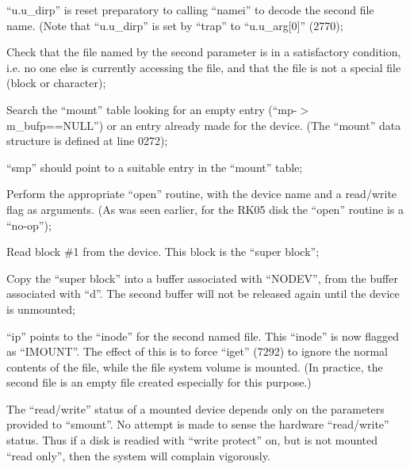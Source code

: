 \item[6096:] ``u.u\_dirp'' is  reset  preparatory
to  calling ``namei'' to decode the
second  file  name.   (Note   that
``u.u\_dirp''  is  set  by ``trap'' to
``u.u\_arg[0]'' (2770);

\item[6100:] Check that the file named by  the
      second  parameter  is in a satisfactory condition,  i.e.  no  one
      else  is  currently accessing the
      file, and that the file is not  a
      special  file  (block  or character);

\item[6103:] Search the ``mount'' table  looking
  for      an      empty      entry
  (``mp-$>$m\_bufp==NULL'') or an  entry
  already   made  for  the  device.
  (The ``mount''  data  structure  is
  defined at line 0272);


\item[6111:] ``smp'' should point to a  suitable
entry in the ``mount'' table;

\item[6113:] Perform  the  appropriate  ``open''
routine, with the device name and
a read/write flag  as  arguments.
(As  was  seen  earlier,  for the
RK05 disk the ``open'' routine is a
``no-op'');


\item[6116:] Read block \#1 from the device.
This block is the ``super block'';

\item[6124:] Copy the ``super block'' into a
buffer associated with ``NODEV'',
from the buffer associated with
``d''. The second buffer will not
 be released again until the device is unmounted;

\item[6130:] ``ip'' points to  the  ``inode''  for
the   second  named  file.   This
``inode''   is   now   flagged   as
``IMOUNT''.  The  effect of this is
to force ``iget'' (7292) to  ignore
the  normal contents of the file,
while the file system  volume  is
mounted. (In practice, the second
file is  an  empty  file  created
especially for this purpose.)
\ed



\bd
\item[1.] The ``read/write'' status of a mounted
device  depends  only on the parameters
provided to ``smount''.   No  attempt  is
made to sense the hardware ``read/write''
status. Thus if a disk is readied  with
``write  protect'' on, but is not mounted
``read only'', then the system will  complain vigorously.

